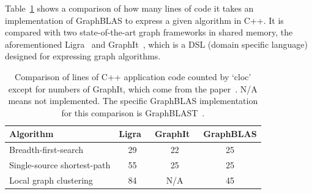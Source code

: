 Table~\ref{tab:loc} shows a comparison of how many lines of code it takes an implementation of GraphBLAS to express a given algorithm in C++. It is compared with two state-of-the-art graph frameworks in shared memory, the aforementioned Ligra~\cite{Shun:2013:Ligra} and GraphIt~\cite{Zhang:2018:GHP}, which is a DSL (domain specific language) designed for expressing graph algorithms.

\begin{table}[t]
	\centering
	\begin{tabular}{lccc}
		\toprule
		Algorithm      & Ligra~\cite{Shun:2013:Ligra} & GraphIt~\cite{Zhang:2018:GHP} & GraphBLAS  \\ \midrule
		Breadth-first-search & 29 & 22  & 25 \\
		Single-source shortest-path   & 55 & 25 & 25 \\
		Local graph clustering  & 84 & N/A  & 45 \\ \bottomrule
	\end{tabular}
	\caption{Comparison of lines of C++ application code counted by `cloc' except for numbers of GraphIt, which come from the paper~\cite{Zhang:2018:GHP}. N/A means not implemented. The specific GraphBLAS implementation for this comparison is GraphBLAST~\cite{Yang:2019:GBL}.\label{tab:loc}}
\end{table}